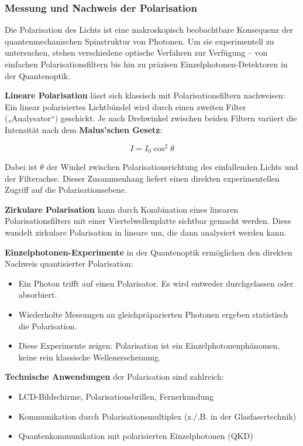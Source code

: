 \subsubsection{Messung und Nachweis der Polarisation}

Die Polarisation des Lichts ist eine makroskopisch beobachtbare Konsequenz der quantenmechanischen Spinstruktur von Photonen. Um sie experimentell zu untersuchen, stehen verschiedene optische Verfahren zur Verfügung – von einfachen Polarisationsfiltern bis hin zu präzisen Einzelphotonen-Detektoren in der Quantenoptik.

\vspace{0.5em}
\textbf{Lineare Polarisation} lässt sich klassisch mit Polarisationsfiltern nachweisen: Ein linear polarisiertes Lichtbündel wird durch einen zweiten Filter („Analysator“) geschickt. Je nach Drehwinkel zwischen beiden Filtern variiert die Intensität nach dem \textbf{Malus’schen Gesetz}:

\[
I = I_0 \cos^2\theta
\]

Dabei ist \( \theta \) der Winkel zwischen Polarisationsrichtung des einfallenden Lichts und der Filterachse. Dieser Zusammenhang liefert einen direkten experimentellen Zugriff auf die Polarisationsebene.

\vspace{0.5em}
\textbf{Zirkulare Polarisation} kann durch Kombination eines linearen Polarisationsfilters mit einer Viertelwellenplatte sichtbar gemacht werden. Diese wandelt zirkulare Polarisation in lineare um, die dann analysiert werden kann.

\vspace{0.5em}
\textbf{Einzelphotonen-Experimente} in der Quantenoptik ermöglichen den direkten Nachweis quantisierter Polarisation:
\begin{itemize}
	\item Ein Photon trifft auf einen Polarisator. Es wird entweder durchgelassen oder absorbiert.
	\item Wiederholte Messungen an gleichpräparierten Photonen ergeben statistisch die Polarisation.
	\item Diese Experimente zeigen: Polarisation ist ein Einzelphotonenphänomen, keine rein klassische Wellenerscheinung.
\end{itemize}

\vspace{0.5em}
\textbf{Technische Anwendungen} der Polarisation sind zahlreich:
\begin{itemize}
	\item LCD-Bildschirme, Polarisationsbrillen, Fernerkundung
	\item Kommunikation durch Polarisationsmultiplex (z./,B. in der Glasfasertechnik)
	\item Quantenkommunikation mit polarisierten Einzelphotonen (QKD)
\end{itemize}

